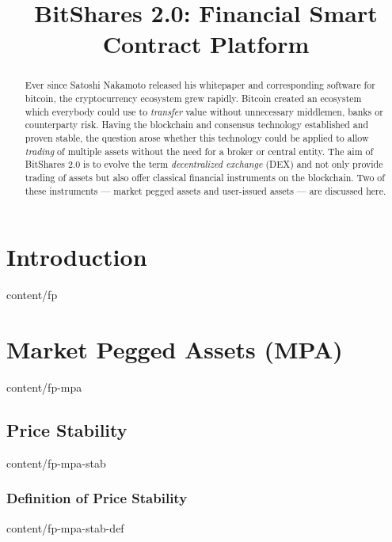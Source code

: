 \documentclass{btswhitepaper}
\title{BitShares 2.0: Financial Smart Contract Platform}
\begin{document}
\sloppy
\maketitle

\begin{abstract}%
 Ever since Satoshi Nakamoto released his whitepaper and corresponding software
 for bitcoin, the cryptocurrency ecosystem grew rapidly. Bitcoin created an
 ecosystem which everybody could use to \emph{transfer} value without
 unnecessary middlemen, banks or counterparty risk. Having the blockchain
 and consensus technology established and proven stable, the question arose
 whether this technology could be applied to allow \emph{trading} of multiple
 assets without the need for a broker or central entity.
 The aim of BitShares 2.0 is to evolve the term \emph{decentralized exchange}
 (DEX) and not only provide trading of assets but also offer classical
 financial instruments on the blockchain. Two of these instruments --- market
 pegged assets and user-issued assets --- are discussed here.

\end{abstract}
\section        { Introduction                                     }  { content/fp                     } 

\section        { Market Pegged Assets (MPA)                       }  { content/fp-mpa                 } 
\subsection     { Price Stability                                  }  { content/fp-mpa-stab            } 
\subsubsection  { Definition of Price Stability                    }  { content/fp-mpa-stab-def        } 
\end{document}
